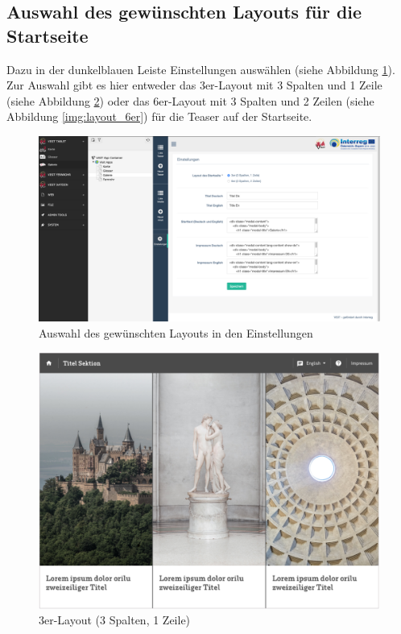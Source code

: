 \subsection{Auswahl des gewünschten Layouts für die Startseite}

Dazu in der dunkelblauen Leiste \glqq Einstellungen\grqq{} auswählen (siehe Abbildung  \ref{img:auswahl_layout}). Zur Auswahl gibt es hier entweder das 3er-Layout mit 3 Spalten und 1 Zeile (siehe Abbildung \ref{img:layout_3er}) oder das 6er-Layout mit 3 Spalten und 2 Zeilen (siehe Abbildung \ref{img:layout_6er}) für die Teaser auf der Startseite.

\begin{figure}[ht!]
\centering
\includegraphics[width=12cm]{Figures/paula/galerie/auswahl_layout.png}
\caption{Auswahl des gewünschten Layouts in den Einstellungen}
\label{img:auswahl_layout}
\end{figure}

\begin{figure}[ht!]
\centering
\includegraphics[width=12cm]{Figures/paula/galerie/layout_3er.png}
\caption{3er-Layout (3 Spalten, 1 Zeile)}
\label{img:layout_3er}
\end{figure}

